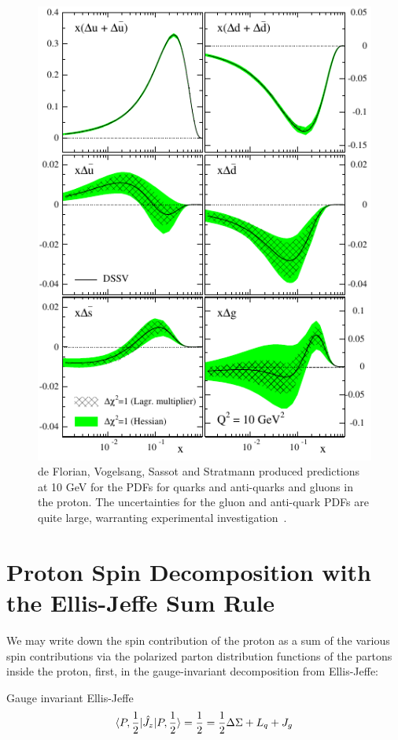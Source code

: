 \begin{figure}[ht]
  \centering
  \includegraphics[width=0.8\linewidth]{./figures/polarized_pdfs_dssv.pdf}
  \caption{
    de Florian, Vogelsang, Sassot and Stratmann produced predictions at 10 GeV
    for the PDFs for quarks and anti-quarks and gluons in the proton. The
    uncertainties for the gluon and anti-quark PDFs are quite large, warranting
    experimental investigation~\cite{DeFlorian2009}.
  }
  \label{fig:polarized_pdfs_2}
\end{figure}

\clearpage
\section{Proton Spin Decomposition with the Ellis-Jeffe Sum Rule }

We may write down the spin contribution of the proton as a sum of the various
spin contributions via the polarized parton distribution functions of the
partons inside the proton, first, in the gauge-invariant decomposition from
Ellis-Jeffe:

{\noindent}Gauge invariant Ellis-Jeffe
\begin{equation}
  \braket{P,{1\over2}|\hat{J_z}|P,{1\over2}}  
 = {1\over2} = {{1\over2}\Delta \Sigma +L_q+J_g}
\label{eq:ellis_jeffe_sum}
\end{equation}

